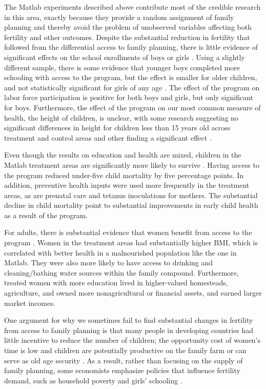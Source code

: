 The Matlab experiments described above contribute most of the credible research in this area, exactly because they provide a random assignment of family planning and thereby avoid the problem of unobserved variables affecting both fertility and other outcomes. Despite the substantial reduction in fertility that followed from the differential access to family planning, there is little evidence of significant effects on the school enrollments of boys or girls \citep{Sinha2005}. Using a slightly different sample, there is some evidence that younger boys completed more schooling with access to the program, but the effect is smaller for older children, and not statistically significant for girls of any age \citep{Joshi2007}. The effect of the program on labor force participation is positive for both boys and girls, but only signiﬁcant for boys. Furthermore, the effect of the program on our most common measure of health, the height of children, is unclear, with some research suggesting no significant differences in height for children less than 15 years old across treatment and control areas \citep{Joshi2007} and other finding a significant effect \citep{Barham2012}.

Even though the results on education and health are mixed, children in the Matlab treatment areas are significantly more likely to survive \citep{Joshi2007}. Having access to the program reduced under-five child mortality by five percentage points. In addition, preventive health inputs were used more frequently in the treatment areas, as are prenatal care and tetanus inoculations for mothers. The substantial decline in child mortality point to substantial improvements in early child health as a result of the program.

For adults, there is substantial evidence that women benefit from access to the program \citep{Joshi2007}. Women in the treatment areas had substantially higher BMI, which is correlated with better health in a malnourished population like the one in Matlab. They were also more likely to have access to drinking and cleaning/bathing water sources within the family compound. Furthermore, treated women with more education lived in higher-valued homesteads, agriculture, and owned more nonagricultural or financial assets, and earned larger market incomes.

One argument for why we sometimes fail to find substantial changes in fertility from access to family planning is that many people in developing countries had little incentive to reduce the number of children; the opportunity cost of women's time is low and children are potentially productive on the family farm or can serve as old age security \citep{Banerjee2014,Lambert2016}. As a result, rather than focusing on the supply of family planning, some economists emphasize policies that influence fertility demand, such as household poverty and girls' schooling \citep{pritchett94a,DasGupta2011}.

